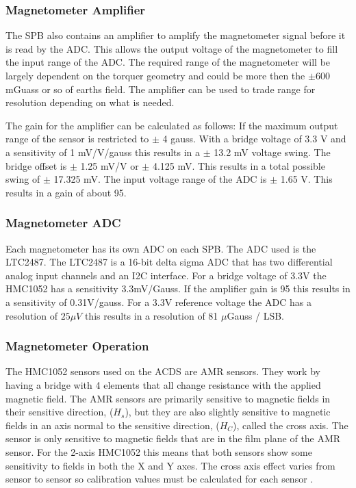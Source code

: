 \subsubsection{Magnetometer Amplifier}


The \ac{SPB} also contains an amplifier to amplify the magnetometer signal before it is read by the \ac{ADC}. This allows the output voltage of the magnetometer to fill the input range of the \ac{ADC}. The required range of the magnetometer will be largely dependent on the torquer geometry and could be more then the $\pm$600 mGuass or so of earths field. The amplifier can be used to trade range for resolution depending on what is needed.

The gain for the amplifier can be calculated as follows: If the maximum output range of the sensor is restricted to $\pm$ 4 gauss. With a bridge voltage of 3.3 V and a sensitivity of 1 mV/V/gauss this results in a $\pm$ 13.2 mV voltage swing. The bridge offset is $\pm$ 1.25 mV/V or $\pm$ 4.125 mV. This results in a total possible swing of $\pm$ 17.325 mV. The input voltage range of the \ac{ADC} is $\pm$ 1.65 V. This results in a gain of about 95. 

\subsubsection{Magnetometer \acl{ADC}}

Each magnetometer has its own \ac{ADC} on each \ac{SPB}. The \ac{ADC} used is the LTC2487. The LTC2487 is a 16-bit delta sigma \ac{ADC} that has two differential analog input channels and an \ac{I2C} interface. For a bridge voltage of 3.3V the HMC1052 has a sensitivity 3.3mV/Gauss. If the amplifier gain is 95 this results in a sensitivity of 0.31V/gauss. For a 3.3V reference voltage the \ac{ADC} has a resolution of $25 \mu V$ this results in a resolution of 81 $\mu$Gauss / LSB.

\subsubsection{Magnetometer Operation}

The HMC1052 sensors used on the \ac{ACDS} are \ac{AMR} sensors. They work by having a bridge with 4 elements that all change resistance with the applied magnetic field. The \ac{AMR} sensors are primarily sensitive to magnetic fields in their sensitive direction, ($H_s$), but they are also slightly sensitive to magnetic fields in an axis normal to the sensitive direction, ($H_C$), called the cross axis. The sensor is only sensitive to magnetic fields that are in the film plane of the \ac{AMR} sensor. For the 2-axis HMC1052 this means that both sensors show some sensitivity to fields in both the X and Y axes. The cross axis effect varies from sensor to sensor  so calibration values must be calculated for each sensor \cite{AN215}.

